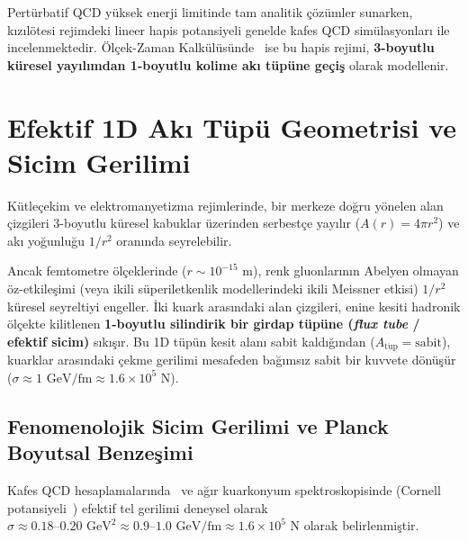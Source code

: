 \documentclass[11pt,a4paper]{article}
\begin{document}
Pertürbatif QCD yüksek enerji limitinde tam analitik çözümler sunarken, kızılötesi rejimdeki lineer hapis potansiyeli genelde kafes QCD simülasyonları ile incelenmektedir. Ölçek-Zaman Kalkülüsünde~\cite{scale_calculus} ise bu hapis rejimi, \textbf{3-boyutlu küresel yayılımdan 1-boyutlu kolime akı tüpüne geçiş} olarak modellenir.

\section{Efektif 1D Akı Tüpü Geometrisi ve Sicim Gerilimi}
\label{sec:doyum_mekanizmasi}

Kütleçekim ve elektromanyetizma rejimlerinde, bir merkeze doğru yönelen alan çizgileri 3-boyutlu küresel kabuklar üzerinden serbestçe yayılır ($A(r) = 4\pi r^2$) ve akı yoğunluğu $1/r^2$ oranında seyrelebilir.

Ancak femtometre ölçeklerinde ($r \sim 10^{-15}\text{ m}$), renk gluonlarının Abelyen olmayan öz-etkileşimi (veya ikili süperiletkenlik modellerindeki ikili Meissner etkisi) $1/r^2$ küresel seyreltiyi engeller. İki kuark arasındaki alan çizgileri, enine kesiti hadronik ölçekte kilitlenen \textbf{1-boyutlu silindirik bir girdap tüpüne (\textit{flux tube} / efektif sicim)} sıkışır. Bu 1D tüpün kesit alanı sabit kaldığından ($A_{\mathrm{t\ddot{u}p}} = \text{sabit}$), kuarklar arasındaki çekme gerilimi mesafeden bağımsız sabit bir kuvvete dönüşür ($\sigma \approx 1\text{ GeV/fm} \approx 1.6 \times 10^5\text{ N}$).

\subsection{Fenomenolojik Sicim Gerilimi ve Planck Boyutsal Benzeşimi}
\label{sec:hiyerarsi_cozumu}

Kafes QCD hesaplamalarında~\cite{wilson1974} ve ağır kuarkonyum spektroskopisinde (Cornell potansiyeli~\cite{eichten1978}) efektif tel gerilimi deneysel olarak $\sigma \approx 0.18\text{--}0.20\text{ GeV}^2 \approx 0.9\text{--}1.0\text{ GeV/fm} \approx 1.6 \times 10^5\text{ N}$ olarak belirlenmiştir.
\end{document}
